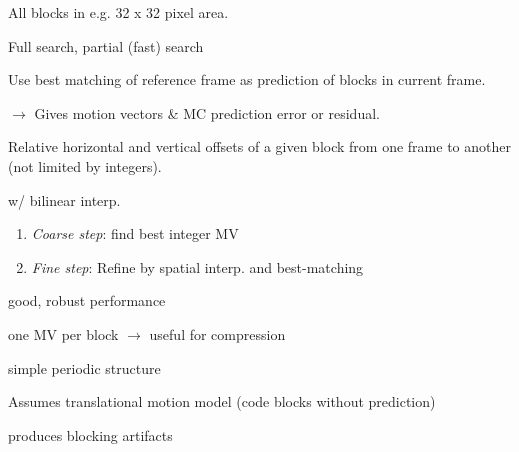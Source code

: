 \begin{definition}
  All blocks in e.g. 32 x 32 pixel area.
\end{definition}

\begin{definition}
  Full search, partial (fast) search
\end{definition}

\begin{algorithm}
  Use best matching of reference frame as prediction of blocks in current frame.

  \(\to\) Gives motion vectors \& MC prediction error or residual.
\end{algorithm}

\begin{definition}
  Relative horizontal and vertical offsets of a given block from one frame to another (not limited by integers).
\end{definition}

\begin{algorithm}
  w/ bilinear interp.
  \begin{enumerate}
    \item \textit{Coarse step}: find best integer MV
    \item \textit{Fine step}: Refine by spatial interp. and best-matching
  \end{enumerate}
\end{algorithm}

\begin{definition}[Advantages]
  \begin{itemize*}
    \item good, robust performance
    \item one MV per block \(\to\) useful for compression
    \item simple periodic structure
  \end{itemize*}
\end{definition}

\begin{definition}[Disadvantages]
  \begin{itemize*}
    \item Assumes translational motion model (code blocks without prediction)
    \item produces blocking artifacts
  \end{itemize*}
\end{definition}

